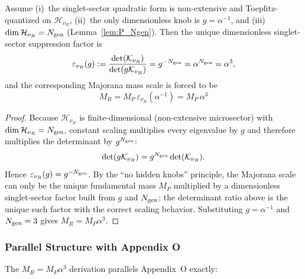 \begin{theorem}\label{thm:P_MR}
Assume (i)~the singlet-sector quadratic form is non-extensive and Toeplitz-quantized on $\mathcal{H}_{\nu_R}$, 
(ii)~the only dimensionless knob is $g=\alpha^{-1}$, and (iii)~$\dim\mathcal{H}_{\nu_R}=N_{\rm gen}$ (Lemma~\ref{lem:P_Ngen}).
Then the unique dimensionless singlet-sector suppression factor is
\begin{equation}
\varepsilon_{\nu_R}(g):=\frac{\det(\mathcal{K}_{\nu_R})}{\det(g\mathcal{K}_{\nu_R})}=g^{-N_{\rm gen}}=\alpha^{N_{\rm gen}}=\alpha^3,
\end{equation}
and the corresponding Majorana mass scale is forced to be
\begin{equation}
\boxed{M_R = M_P\,\varepsilon_{\nu_R}(\alpha^{-1}) = M_P\,\alpha^3}
\end{equation}
\end{theorem}

\begin{proof}
Because $\mathcal{H}_{\nu_R}$ is finite-dimensional (non-extensive microsector) with $\dim\mathcal{H}_{\nu_R}=N_{\rm gen}$, 
constant scaling multiplies every eigenvalue by $g$ and therefore multiplies the determinant by $g^{N_{\rm gen}}$:
\begin{equation}
\det(g\mathcal{K}_{\nu_R})=g^{N_{\rm gen}}\det(\mathcal{K}_{\nu_R}).
\end{equation}
Hence $\varepsilon_{\nu_R}(g)=g^{-N_{\rm gen}}$.
By the ``no hidden knobs'' principle, the Majorana scale can only be the unique fundamental mass $M_P$ multiplied 
by a dimensionless singlet-sector factor built from $g$ and $N_{\rm gen}$; the determinant ratio above is the unique 
such factor with the correct scaling behavior.
Substituting $g=\alpha^{-1}$ and $N_{\rm gen}=3$ gives $M_R=M_P\alpha^3$.
\end{proof}

\subsubsection{Parallel Structure with Appendix O}\label{sec:P_parallel}

The $M_R = M_P \alpha^3$ derivation parallels Appendix~O exactly:

